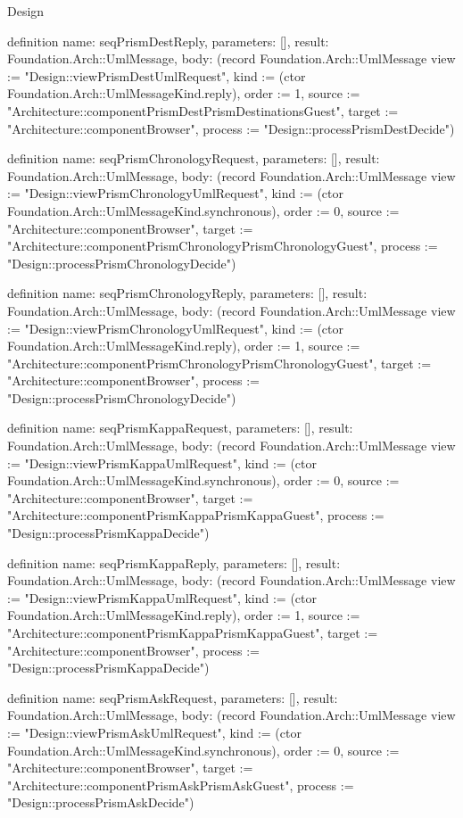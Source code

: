 \begin{lexlean}{Design}
\begin{semanticmodule}
definition{
  name: seqPrismDestReply,
  parameters: [],
  result: Foundation.Arch::UmlMessage,
  body: (record Foundation.Arch::UmlMessage {view := "Design::viewPrismDestUmlRequest", kind := (ctor Foundation.Arch::UmlMessageKind.reply), order := 1, source := "Architecture::componentPrismDestPrismDestinationsGuest", target := "Architecture::componentBrowser", process := "Design::processPrismDestDecide"})
}

definition{
  name: seqPrismChronologyRequest,
  parameters: [],
  result: Foundation.Arch::UmlMessage,
  body: (record Foundation.Arch::UmlMessage {view := "Design::viewPrismChronologyUmlRequest", kind := (ctor Foundation.Arch::UmlMessageKind.synchronous), order := 0, source := "Architecture::componentBrowser", target := "Architecture::componentPrismChronologyPrismChronologyGuest", process := "Design::processPrismChronologyDecide"})
}

definition{
  name: seqPrismChronologyReply,
  parameters: [],
  result: Foundation.Arch::UmlMessage,
  body: (record Foundation.Arch::UmlMessage {view := "Design::viewPrismChronologyUmlRequest", kind := (ctor Foundation.Arch::UmlMessageKind.reply), order := 1, source := "Architecture::componentPrismChronologyPrismChronologyGuest", target := "Architecture::componentBrowser", process := "Design::processPrismChronologyDecide"})
}

definition{
  name: seqPrismKappaRequest,
  parameters: [],
  result: Foundation.Arch::UmlMessage,
  body: (record Foundation.Arch::UmlMessage {view := "Design::viewPrismKappaUmlRequest", kind := (ctor Foundation.Arch::UmlMessageKind.synchronous), order := 0, source := "Architecture::componentBrowser", target := "Architecture::componentPrismKappaPrismKappaGuest", process := "Design::processPrismKappaDecide"})
}

definition{
  name: seqPrismKappaReply,
  parameters: [],
  result: Foundation.Arch::UmlMessage,
  body: (record Foundation.Arch::UmlMessage {view := "Design::viewPrismKappaUmlRequest", kind := (ctor Foundation.Arch::UmlMessageKind.reply), order := 1, source := "Architecture::componentPrismKappaPrismKappaGuest", target := "Architecture::componentBrowser", process := "Design::processPrismKappaDecide"})
}

definition{
  name: seqPrismAskRequest,
  parameters: [],
  result: Foundation.Arch::UmlMessage,
  body: (record Foundation.Arch::UmlMessage {view := "Design::viewPrismAskUmlRequest", kind := (ctor Foundation.Arch::UmlMessageKind.synchronous), order := 0, source := "Architecture::componentBrowser", target := "Architecture::componentPrismAskPrismAskGuest", process := "Design::processPrismAskDecide"})
}


\end{semanticmodule}
\end{lexlean}
